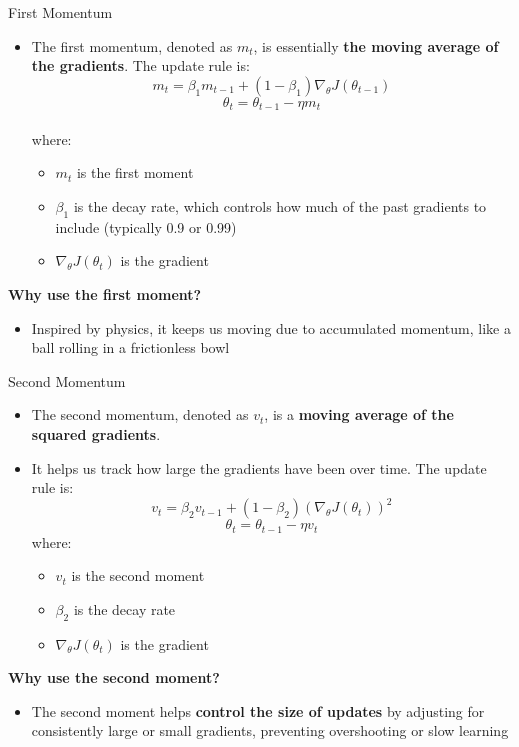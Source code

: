 \documentclass[serif, aspectratio=169]{beamer}
\begin{document}
\begin{frame}{First Momentum}
    \begin{itemize}
        \item The first momentum, denoted as $m_t$, is essentially \textbf{the moving average of the gradients}. The update rule is:
        \[m_t = \beta_1 m_{t-1} + (1 - \beta_1) \nabla_{\theta}J(\theta_{t-1})\]
        \[\theta_t = \theta_{t-1} - \eta m_t\]\\
        where:
        \begin{itemize}
            \item $m_t$ is the first moment
            \item $\beta_1$ is the decay rate, which controls how much of the past gradients to include (typically 0.9 or 0.99)\\
            \item $\nabla_{\theta}J(\theta_t)$ is the gradient
        \end{itemize}
    \end{itemize}
    \textbf{Why use the first moment?}
    \begin{itemize}
        \item Inspired by physics, it keeps us moving due to accumulated momentum, like a ball rolling in a frictionless bowl 
    \end{itemize}
\end{frame}

\begin{frame}{Second Momentum}
    \begin{itemize}
        \item The second momentum, denoted as $v_t$, is a \textbf{moving average of the squared gradients}. 
        \item It helps us track how large the gradients have been over time. The update rule is:
        \[v_t = \beta_2 v_{t-1} + (1 - \beta_2) (\nabla_{\theta} J(\theta_t))^2\]
        \[\theta_t = \theta_{t-1} - \eta v_t\]
        where:
        \begin{itemize}
            \item $v_t$ is the second moment
            \item $\beta_2$ is the decay rate
            \item $\nabla_{\theta} J(\theta_t)$ is the gradient
        \end{itemize}
    \end{itemize}
    
    \textbf{Why use the second moment?}
    \begin{itemize}
        \item The second moment helps \textbf{control the size of updates} by adjusting for consistently large or small gradients, preventing overshooting or slow learning
    \end{itemize}
\end{frame}
\end{document}
